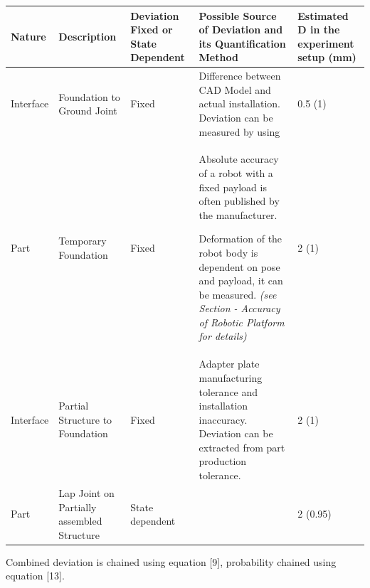 \documentclass[11pt]{book}
\begin{document}
\begin{table}[H]
\begin{adjustbox}{max width=\textwidth}
\begin{tabular}{p{1.72cm}p{3.94cm}p{1.98cm}p{6.27cm}p{2.01cm}}
\hline
\multicolumn{1}{|p{1.72cm}}{{\scriptsize \textbf{Nature}}} & 
\multicolumn{1}{|p{3.94cm}}{{\scriptsize \textbf{Description }}} & 
\multicolumn{1}{|p{1.98cm}}{{\scriptsize \textbf{Deviation Fixed or State Dependent}}} & 
\multicolumn{1}{|p{6.27cm}}{{\scriptsize \textbf{Possible Source of Deviation and its Quantification Method}}} & 
\multicolumn{1}{|p{2.01cm}|}{{\scriptsize \textbf{Estimated D in the experiment setup (mm)}}} \\ 
\hline
\multicolumn{1}{|p{1.72cm}}{{\scriptsize Interface}} & 
\multicolumn{1}{|p{3.94cm}}{{\scriptsize Foundation to Ground Joint}} & 
\multicolumn{1}{|p{1.98cm}}{{\scriptsize Fixed}} & 
\multicolumn{1}{|p{6.27cm}}{{\scriptsize Difference between CAD Model and actual installation. Deviation can be measured by using }} & 
\multicolumn{1}{|p{2.01cm}|}{{\scriptsize 0.5 (1)}} \\ 
\hline
\multicolumn{1}{|p{1.72cm}}{{\scriptsize Part}} & 
\multicolumn{1}{|p{3.94cm}}{{\scriptsize Temporary Foundation}} & 
\multicolumn{1}{|p{1.98cm}}{{\scriptsize Fixed}} & 
\multicolumn{1}{|p{6.27cm}}{{\scriptsize Absolute accuracy of a robot with a fixed payload is often published by the manufacturer. } \newline
{\scriptsize Deformation of the robot body is dependent on pose and payload, it can be measured. \textit{(see Section - Accuracy of Robotic Platform for details)}\par}} & 
\multicolumn{1}{|p{2.01cm}|}{{\scriptsize 2 (1)}} \\ 
\hline
\multicolumn{1}{|p{1.72cm}}{{\scriptsize Interface}} & 
\multicolumn{1}{|p{3.94cm}}{{\scriptsize Partial Structure to Foundation}} & 
\multicolumn{1}{|p{1.98cm}}{{\scriptsize Fixed}} & 
\multicolumn{1}{|p{6.27cm}}{{\scriptsize Adapter plate manufacturing tolerance and installation inaccuracy. Deviation can be extracted from part production tolerance.\par}} & 
\multicolumn{1}{|p{2.01cm}|}{{\scriptsize 2 (1)}} \\ 
\hline
\multicolumn{1}{|p{1.72cm}}{{\scriptsize Part}} & 
\multicolumn{1}{|p{3.94cm}}{{\scriptsize Lap Joint on Partially assembled Structure}} & 
\multicolumn{1}{|p{1.98cm}}{{\scriptsize State dependent}} & 
\multicolumn{1}{|p{6.27cm}}{} & 
\multicolumn{1}{|p{2.01cm}|}{{\scriptsize 2 (0.95)}} \\ 
\hline
\end{tabular}
\end{adjustbox}
\end{table}
\vspace{16\baselineskip}
Combined deviation is chained using equation [9], probability chained using equation [13]. 
\end{document}
